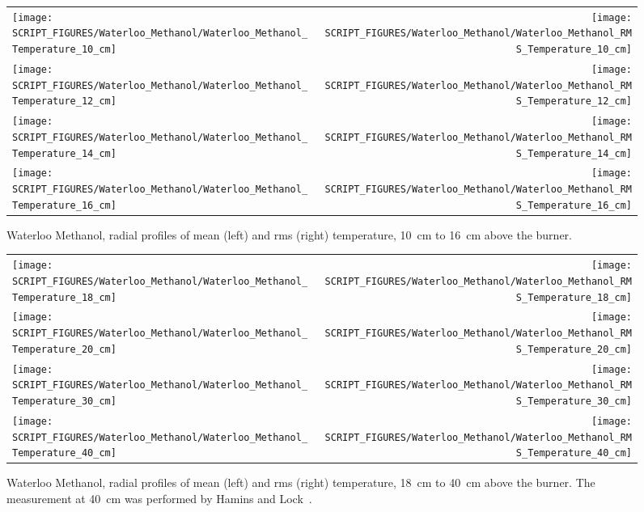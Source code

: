 \begin{figure}[p]
\begin{tabular*}{\textwidth}{l@{\extracolsep{\fill}}r}
\texttt{[image: SCRIPT\_FIGURES/Waterloo\_Methanol/Waterloo\_Methanol\_Temperature\_10\_cm]} &
\texttt{[image: SCRIPT\_FIGURES/Waterloo\_Methanol/Waterloo\_Methanol\_RMS\_Temperature\_10\_cm]} \\
\texttt{[image: SCRIPT\_FIGURES/Waterloo\_Methanol/Waterloo\_Methanol\_Temperature\_12\_cm]} &
\texttt{[image: SCRIPT\_FIGURES/Waterloo\_Methanol/Waterloo\_Methanol\_RMS\_Temperature\_12\_cm]} \\
\texttt{[image: SCRIPT\_FIGURES/Waterloo\_Methanol/Waterloo\_Methanol\_Temperature\_14\_cm]} &
\texttt{[image: SCRIPT\_FIGURES/Waterloo\_Methanol/Waterloo\_Methanol\_RMS\_Temperature\_14\_cm]} \\
\texttt{[image: SCRIPT\_FIGURES/Waterloo\_Methanol/Waterloo\_Methanol\_Temperature\_16\_cm]} &
\texttt{[image: SCRIPT\_FIGURES/Waterloo\_Methanol/Waterloo\_Methanol\_RMS\_Temperature\_16\_cm]}
\end{tabular*}
\caption[Waterloo Methanol, radial mean and rms temperature, 10~cm to 16~cm above burner]
{Waterloo Methanol, radial profiles of mean (left) and rms (right) temperature, 10~cm to 16~cm above the burner.}
\label{Water_Methanol_Plume_Temp_2}
\end{figure}

\begin{figure}[p]
\begin{tabular*}{\textwidth}{l@{\extracolsep{\fill}}r}
\texttt{[image: SCRIPT\_FIGURES/Waterloo\_Methanol/Waterloo\_Methanol\_Temperature\_18\_cm]} &
\texttt{[image: SCRIPT\_FIGURES/Waterloo\_Methanol/Waterloo\_Methanol\_RMS\_Temperature\_18\_cm]} \\
\texttt{[image: SCRIPT\_FIGURES/Waterloo\_Methanol/Waterloo\_Methanol\_Temperature\_20\_cm]} &
\texttt{[image: SCRIPT\_FIGURES/Waterloo\_Methanol/Waterloo\_Methanol\_RMS\_Temperature\_20\_cm]} \\
\texttt{[image: SCRIPT\_FIGURES/Waterloo\_Methanol/Waterloo\_Methanol\_Temperature\_30\_cm]} &
\texttt{[image: SCRIPT\_FIGURES/Waterloo\_Methanol/Waterloo\_Methanol\_RMS\_Temperature\_30\_cm]} \\
\texttt{[image: SCRIPT\_FIGURES/Waterloo\_Methanol/Waterloo\_Methanol\_Temperature\_40\_cm]} &
\texttt{[image: SCRIPT\_FIGURES/Waterloo\_Methanol/Waterloo\_Methanol\_RMS\_Temperature\_40\_cm]}
\end{tabular*}
\caption[Waterloo Methanol, radial mean and rms temperature, 18~cm to 40~cm above burner]
{Waterloo Methanol, radial profiles of mean (left) and rms (right) temperature, 18~cm to 40~cm above the burner. The measurement at 40~cm was performed by Hamins and Lock~\cite{Hamins:TN1928}.}
\label{Water_Methanol_Plume_Temp_3}
\end{figure}

